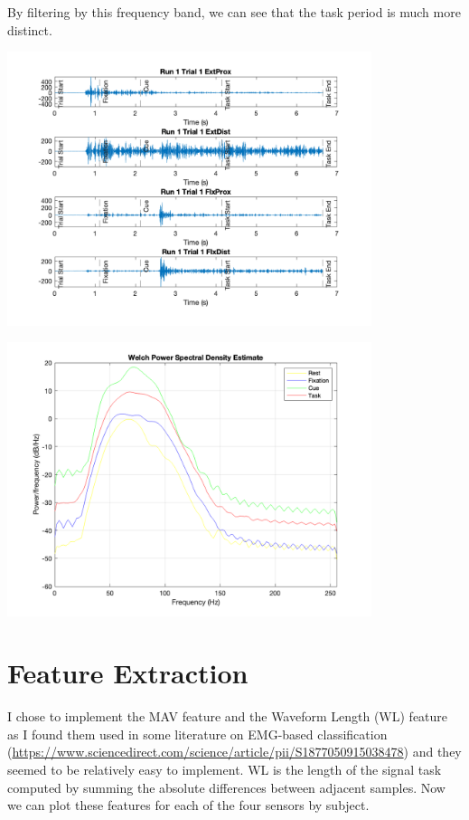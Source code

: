 \documentclass[12pt]{article}
\begin{document}
By filtering by this frequency band, we can see that the task period is much more distinct.

\begin{center}
    \includegraphics[width=0.8\textwidth]{filtered_signals.png}
\end{center}

\begin{center}
    \includegraphics[width=0.8\textwidth]{filtered_welch.png}
\end{center}

\section{Feature Extraction}
I chose to implement the MAV feature and the Waveform Length (WL) feature as I found them used in some literature on EMG-based classification (\url{https://www.sciencedirect.com/science/article/pii/S1877050915038478}) and they seemed to be relatively easy to implement. WL is the length of the signal task computed by summing the absolute differences between adjacent samples. Now we can plot these features for each of the four sensors by subject.
\end{document}
